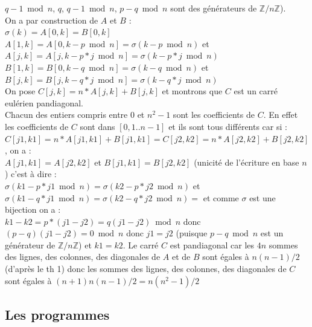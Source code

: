 \documentclass[a4paper,11pt]{book}
\newcommand{\Z}{{\mathbb{Z}}}
\begin{document}
$q-1\bmod n$, $q$, $q-1\bmod n$, $p-q \bmod n$ sont des g\'en\'erateurs de  
$\Z/n\Z$).\\
On a par construction de $A$ et $B$ :\\
$\sigma(k)=A[0,k]=B[0,k]$\\
$A[1,k]=A[0,k-p \bmod n]=\sigma(k-p\bmod n)$ et\\
$A[j,k]=A[j,k-p*j \bmod n]=\sigma(k-p*j\bmod n)$\\
$B[1,k]=B[0,k-q \bmod n]=\sigma(k-q\bmod n)$ et\\
$B[j,k]=B[j,k-q*j \bmod n]=\sigma(k-q*j\bmod n)$\\
On pose $C[j,k]=n*A[j,k]+B[j,k]$ et montrons que $C$ est un carr\'e eul\'erien 
pandiagonal.\\
Chacun des entiers compris entre 0 et $n^2-1$ sont les coefficients de $C$.
En effet les coefficients de $C$ sont dans $[0,1..n-1]$ et ils sont tous 
diff\'erents car si :\\
$C[j1,k1]=n*A[j1,k1]+B[j1,k1]=C[j2,k2]=n*A[j2,k2]+B[j2,k2]$, on a :\\
$A[j1,k1]=A[j2,k2]$ et $B[j1,k1]=B[j2,k2]$ (unicit\'e de l'\'ecriture en base 
$n$) c'est \`a dire :\\
$\sigma(k1-p*j1\bmod n)=\sigma(k2-p*j2\bmod n)$ et \\
$\sigma(k1-q*j1\bmod n)=\sigma(k2-q*j2\bmod n)=$ et comme 
$\sigma$ est une bijection on a :\\
$k1-k2=p*(j1-j2)=q(j1-j2) \bmod n$ donc
$(p-q)(j1-j2)=0\bmod n$ donc $j1=j2$ (puisque $p-q \bmod n$ est un 
g\'en\'erateur de  $\Z/n\Z$) et $k1=k2$.
Le carr\'e $C$ est pandiagonal car les $4n$ sommes des lignes, des colonnes, 
des diagonales de $A$ et de $B$ sont \'egales \`a $n(n-1)/2$ (d'apr\`es le th 1)
donc les sommes des lignes, des colonnes, des diagonales de $C$ sont \'egales 
\`a $(n+1)n(n-1)/2=n(n^2-1)/2$ 
\subsection{Les programmes}
\end{document}
